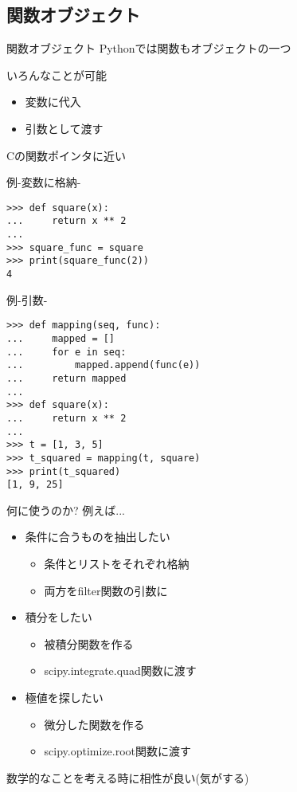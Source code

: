 \documentclass[12pt, xetex, xcolor=pdftex, dvipsnames]{beamer}
\begin{document}
\subsection{関数オブジェクト}
\begin{frame}{関数オブジェクト}
    Pythonでは関数もオブジェクトの一つ

    いろんなことが可能
    \begin{itemize}
        \item 変数に代入
        \item 引数として渡す
    \end{itemize}

    Cの関数ポインタに近い
\end{frame}
\begin{frame}[fragile]{例-変数に格納-}
\begin{lstlisting}
>>> def square(x):
...     return x ** 2
... 
>>> square_func = square
>>> print(square_func(2))
4
\end{lstlisting}
\end{frame}
\begin{frame}[fragile]{例-引数-}
\begin{lstlisting}
>>> def mapping(seq, func):
...     mapped = []
...     for e in seq:
...         mapped.append(func(e))
...     return mapped
... 
>>> def square(x):
...     return x ** 2
... 
>>> t = [1, 3, 5]
>>> t_squared = mapping(t, square)
>>> print(t_squared)
[1, 9, 25]
\end{lstlisting}
\end{frame}
\begin{frame}{何に使うのか?}
    例えば...
    \begin{itemize}
        \item 条件に合うものを抽出したい
        \begin{itemize}
            \item 条件とリストをそれぞれ格納
            \item 両方をfilter関数の引数に
        \end{itemize}
        \item 積分をしたい
        \begin{itemize}
            \item 被積分関数を作る
            \item scipy.integrate.quad関数に渡す
        \end{itemize}
        \item 極値を探したい
        \begin{itemize}
            \item 微分した関数を作る
            \item scipy.optimize.root関数に渡す
        \end{itemize}
    \end{itemize}

    数学的なことを考える時に相性が良い(気がする)
\end{frame}
\end{document}
